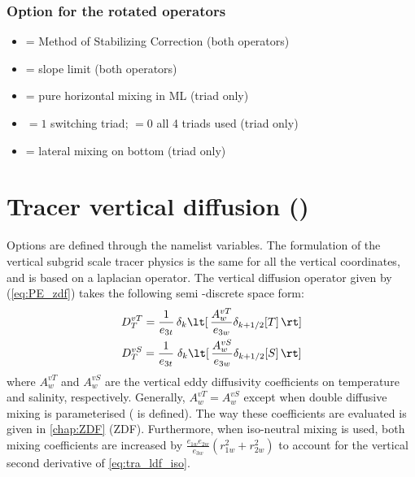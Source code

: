 \documentclass[../main/NEMO_manual]{subfiles}
\begin{document}
\subsubsection{Option for the rotated operators}
\label{subsec:TRA_ldf_options}

\begin{itemize}
\item {} = Method of Stabilizing Correction (both operators)
\item {} = slope limit (both operators)
\item {} = pure horizontal mixing in ML (triad only)
\item {} $= 1$ switching triad; $= 0$ all 4 triads used (triad only) 
\item {} = lateral mixing on bottom (triad only)
\end{itemize}

\section{Tracer vertical diffusion (\protect{})}
\label{sec:TRA_zdf}


Options are defined through the  namelist variables.
The formulation of the vertical subgrid scale tracer physics is the same for all the vertical coordinates,
and is based on a laplacian operator.
The vertical diffusion operator given by (\autoref{eq:PE_zdf}) takes the following semi -discrete space form:
\begin{gather*}
    D^{vT}_T = \frac{1}{e_{3t}} \, \delta_k \lt[ \, \frac{A^{vT}_w}{e_{3w}} \delta_{k + 1/2}[T] \, \rt] \\
    D^{vS}_T = \frac{1}{e_{3t}} \; \delta_k \lt[ \, \frac{A^{vS}_w}{e_{3w}} \delta_{k + 1/2}[S] \, \rt]
\end{gather*}
where $A_w^{vT}$ and $A_w^{vS}$ are the vertical eddy diffusivity coefficients on temperature and salinity,
respectively.
Generally, $A_w^{vT} = A_w^{vS}$ except when double diffusive mixing is parameterised
(\ie {} is defined).
The way these coefficients are evaluated is given in \autoref{chap:ZDF} (ZDF).
Furthermore, when iso-neutral mixing is used, both mixing coefficients are increased by
$\frac{e_{1w} e_{2w}}{e_{3w} }({r_{1w}^2 + r_{2w}^2})$ to account for the vertical second derivative of
\autoref{eq:tra_ldf_iso}.
\end{document}
